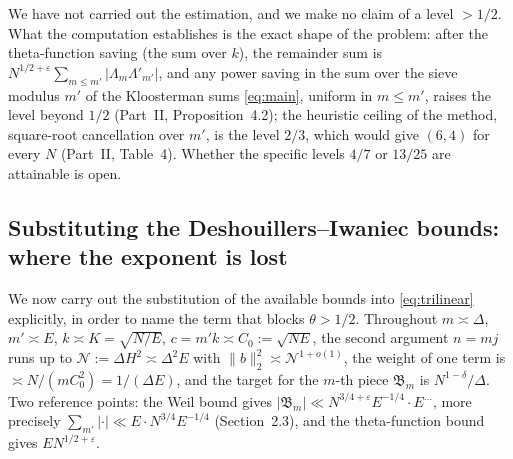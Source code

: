 \documentclass[11pt,a4paper]{article}
\theoremstyle{remark}
\theoremstyle{definition}
\newcommand{\e}{\varepsilon}
\begin{document}
We have not carried out the estimation, and we make no claim of a level $>1/2$. What the computation establishes is the exact shape of the problem: after the theta-function saving (the sum over $k$), the remainder sum is $N^{1/2+\e}\sum_{m\le m'}|\Lambda_m\Lambda'_{m'}|$, and any power saving in the sum over the sieve modulus $m'$ of the Kloosterman sums \eqref{eq:main}, uniform in $m\le m'$, raises the level beyond $1/2$ (Part~II, Proposition~4.2); the heuristic ceiling of the method, square-root cancellation over $m'$, is the level $2/3$, which would give $(6,4)$ for every $N$ (Part~II, Table~4). Whether the specific levels $4/7$ or $13/25$ are attainable is open.

\subsection{Substituting the Deshouillers--Iwaniec bounds: where the exponent is lost}\label{subsec:subst}
We now carry out the substitution of the available bounds into \eqref{eq:trilinear} explicitly, in order to name the term that blocks $\theta>1/2$. Throughout $m\asymp\Delta$, $m'\asymp E$, $k\asymp K=\sqrt{N/E}$, $c=m'k\asymp C_0:=\sqrt{NE}$, the second argument $n=mj$ runs up to $\mathcal N:=\Delta H^2\asymp\Delta^2E$ with $\|b\|_2^2\asymp\mathcal N^{1+o(1)}$, the weight of one term is $\asymp N/(mC_0^2)=1/(\Delta E)$, and the target for the $m$-th piece $\mathfrak B_m$ is $N^{1-\delta}/\Delta$. Two reference points: the Weil bound gives $|\mathfrak B_m|\ll N^{3/4+\e}E^{-1/4}\cdot E^{\ldots}$, more precisely $\sum_{m'}|\cdot|\ll E\cdot N^{3/4}E^{-1/4}$ (Section~2.3), and the theta-function bound gives $EN^{1/2+\e}$.
\end{document}

